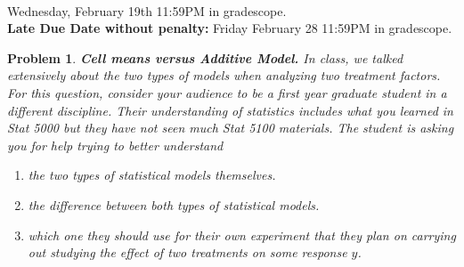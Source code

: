 \documentclass[11pt]{exam}
\newtheorem{problem}{Problem}
\newcommand{\1}{\boldsymbol{1}}
\newcommand{\0}{\boldsymbol{0}}
\begin{document}
 \\


 Wednesday, February 19th 11:59PM in gradescope. \\
{\bf Late Due Date without penalty:}  Friday February 28 11:59PM in gradescope. \\

\hrulefill

\begin{problem}{\textbf{Cell means versus Additive Model.}}
In class, we talked extensively about the two types of models when analyzing two treatment factors. For this question, consider your audience to be a first year graduate student in	 a different discipline. Their understanding of statistics includes what you learned in Stat 5000 but they have not seen much Stat 5100 materials. The student is asking you for help trying to better understand 

\begin{enumerate}
	\item[a)] the two types of statistical models themselves. \\[5cm]
	\item[b)] the difference between both types of statistical models.  \\[5cm]
	\item[c)] which one they should use for their own experiment that they plan on carrying out studying the effect of two treatments on some response $y$.\\[5cm]
\end{enumerate}


\end{problem}
\end{document}

